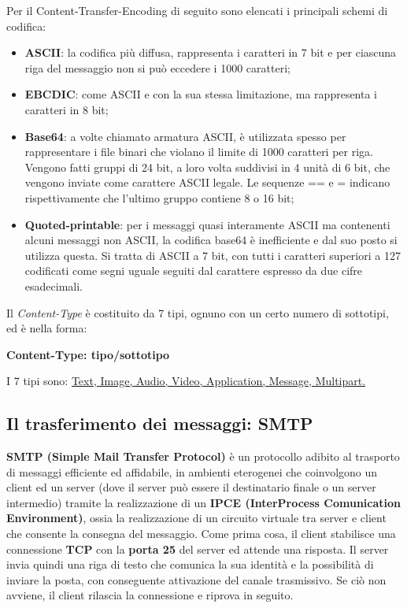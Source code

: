         Per il Content-Transfer-Encoding di seguito sono elencati i principali schemi di codifica:
        \begin{itemize}
            \item \textbf{ASCII}: la codifica più diffusa, rappresenta i caratteri in 7 bit e per ciascuna riga del
            messaggio non si può eccedere i 1000 caratteri;
            \item \textbf{EBCDIC}: come ASCII e con la sua stessa limitazione, ma rappresenta i caratteri in 8 bit;
            \item \textbf{Base64}: a volte chiamato armatura ASCII, è utilizzata spesso per rappresentare i file
            binari che violano il limite di 1000 caratteri per riga. Vengono fatti gruppi di 24 bit, a
            loro volta suddivisi in 4 unità di 6 bit, che vengono inviate come carattere ASCII legale.
            Le sequenze == e = indicano rispettivamente che l’ultimo gruppo contiene 8 o 16 bit;
            \item \textbf{Quoted-printable}: per i messaggi quasi interamente ASCII ma contenenti alcuni
            messaggi non ASCII, la codifica base64 è inefficiente e dal suo posto si utilizza questa. Si
            tratta di ASCII a 7 bit, con tutti i caratteri superiori a 127 codificati come segni uguale
            seguiti dal carattere espresso da due cifre esadecimali.
        \end{itemize}
        
        Il \textit{Content-Type} è costituito da 7 tipi, ognuno con un certo numero di sottotipi, ed è nella forma:
        \begin{center}
            \textbf{Content-Type: tipo/sottotipo}
        \end{center}
        I 7 tipi sono: \underline{Text, Image, Audio, Video, Application, Message, Multipart.}

    \subsection{Il trasferimento dei messaggi: SMTP}
    
    \textbf{SMTP (Simple Mail Transfer Protocol)} è un protocollo adibito al trasporto di messaggi
    efficiente ed affidabile, in ambienti eterogenei che coinvolgono un client ed un server (dove il
    server può essere il destinatario finale o un server intermedio) tramite la realizzazione di un
    \textbf{IPCE (InterProcess Comunication Environment)}, ossia la realizzazione di un circuito
    virtuale tra server e client che consente la consegna del messaggio.
    Come prima cosa, il client stabilisce una connessione \textbf{TCP} con la \textbf{porta 25} del server ed attende
    una risposta. Il server invia quindi una riga di testo che comunica la sua identità e la possibilità
    di inviare la posta, con conseguente attivazione del canale trasmissivo. Se ciò non avviene, il
    client rilascia la connessione e riprova in seguito.\\

